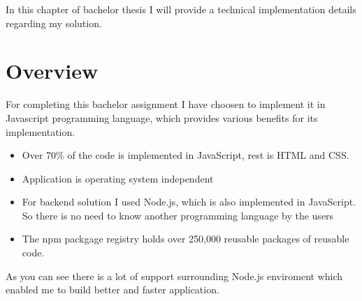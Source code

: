 In this chapter of bachelor thesis I will provide a technical implementation details regarding my solution.
\section{Overview} %
\label{sec:overview}
For completing this bachelor assignment I have choosen to implement it in Javascript programming language, which provides various benefits for its implementation.
\begin{itemize}
\item Over 70\% of the code is implemented in JavaScript, rest is HTML and CSS.
\item Application is operating system independent
\item For backend solution I used Node.js, which is also implemented in JavaScript. So there is no need to know another programming language by the users
\item The npm packgage registry holds over 250,000 reusable packages of reusable code.
\end{itemize}
As you can see there is a lot of support surrounding Node.js enviroment which enabled me to build better and faster application.
